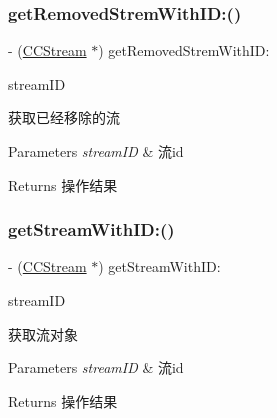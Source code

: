 \subsubsection{\texorpdfstring{get\+Removed\+Strem\+With\+I\+D\+:()}{getRemovedStremWithID:()}}
{\footnotesize\ttfamily -\/ (\hyperlink{interface_c_c_stream}{C\+C\+Stream} $\ast$) get\+Removed\+Strem\+With\+I\+D\+: \begin{DoxyParamCaption}\item[{(N\+S\+String $\ast$)}]{stream\+ID }\end{DoxyParamCaption}}

获取已经移除的流 
\begin{DoxyParams}{Parameters}
{\em stream\+ID} & 流id \\
\hline
\end{DoxyParams}
\begin{DoxyReturn}{Returns}
操作结果 
\end{DoxyReturn}
\mbox{\label{interface_c_c_speaker_afaaf11a11080fff3ce0157ba4ab2d904}} 
\subsubsection{\texorpdfstring{get\+Stream\+With\+I\+D\+:()}{getStreamWithID:()}}
{\footnotesize\ttfamily -\/ (\hyperlink{interface_c_c_stream}{C\+C\+Stream} $\ast$) get\+Stream\+With\+I\+D\+: \begin{DoxyParamCaption}\item[{(N\+S\+String $\ast$)}]{stream\+ID }\end{DoxyParamCaption}}

获取流对象 
\begin{DoxyParams}{Parameters}
{\em stream\+ID} & 流id \\
\hline
\end{DoxyParams}
\begin{DoxyReturn}{Returns}
操作结果 
\end{DoxyReturn}
\mbox{\label{interface_c_c_speaker_a612d3ca702b8e8f8dcd94c285cdcd807}} 

